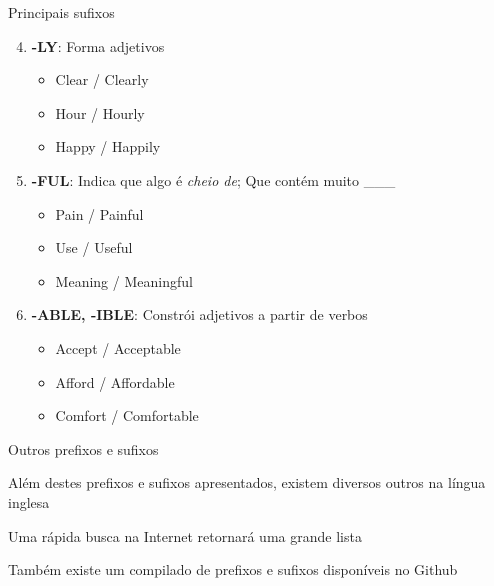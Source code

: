 \documentclass[compress,mathserif,xcolor=table]{beamer}
\begin{document}
\begin{frame}{Principais sufixos}

\begin{enumerate}
    \setcounter{enumi}{3}
    \item \textbf{-LY}: Forma adjetivos
    \begin{itemize}
        \item Clear / Clearly
        \item Hour / Hourly
        \item Happy / Happily
    \end{itemize}
    \vspace{0.75cm}
    \item \textbf{-FUL}: Indica que algo é \textit{cheio de}; Que contém muito \_\_\_
    \begin{itemize}
        \item Pain / Painful
        \item Use / Useful
        \item Meaning / Meaningful
    \end{itemize}
    \vspace{0.75cm}
    \item \textbf{-ABLE, -IBLE}: Constrói adjetivos a partir de verbos
    \begin{itemize}
        \item Accept / Acceptable
        \item Afford / Affordable
        \item Comfort / Comfortable
    \end{itemize}
\end{enumerate}
\end{frame}


\begin{frame}{Outros prefixos e sufixos}

Além destes prefixos e sufixos apresentados, existem diversos outros na língua inglesa

\vspace{0.5cm}

Uma rápida busca na Internet retornará uma grande lista

\vspace{0.5cm}

Também existe um compilado de prefixos e sufixos disponíveis no Github
\href{https://github.com/iagoac/dce747/tree/main/material_apoio}{}
\end{frame}
\end{document}

